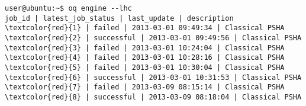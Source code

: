 \begin{Verbatim}[frame=single, commandchars=\\\{\}, fontsize=\small]
user@ubuntu:~$ oq engine --lhc
job_id | latest_job_status | last_update | description
\textcolor{red}{1} | failed | 2013-03-01 09:49:34 | Classical PSHA
\textcolor{red}{2} | successful | 2013-03-01 09:49:56 | Classical PSHA
\textcolor{red}{3} | failed | 2013-03-01 10:24:04 | Classical PSHA
\textcolor{red}{4} | failed | 2013-03-01 10:28:16 | Classical PSHA
\textcolor{red}{5} | failed | 2013-03-01 10:30:04 | Classical PSHA
\textcolor{red}{6} | successful | 2013-03-01 10:31:53 | Classical PSHA
\textcolor{red}{7} | failed | 2013-03-09 08:15:14 | Classical PSHA
\textcolor{red}{8} | successful | 2013-03-09 08:18:04 | Classical PSHA
\end{Verbatim}